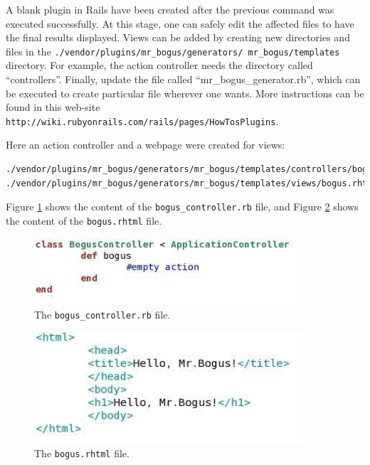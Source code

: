\documentclass{article}
\begin{document}
A blank plugin in Rails have been created after the previous command was executed successfully. At this stage, one can safely edit the affected files to have the final results displayed. Views can be added by creating new directories and files in the \texttt{./vendor/plugins/mr\_bogus/generators/ mr\_bogus/templates} directory. For example, the action controller needs the directory called ``controllers''. Finally, update the file called ``mr\_bogus\_generator.rb'', which can be executed to create particular file wherever one wants. More instructions can be found in this web-site \texttt{http://wiki.rubyonrails.com/rails/pages/HowTosPlugins}.

Here an action controller and a webpage were created for views:

\begin{verbatim}
./vendor/plugins/mr_bogus/generators/mr_bogus/templates/controllers/bogus_controller.rb
./vendor/plugins/mr_bogus/generators/mr_bogus/templates/views/bogus.rhtml
\end{verbatim}

Figure \ref{fig:instruction-3} shows the content of the \texttt{bogus\_controller.rb} file, and Figure \ref{fig:instruction-4} shows the content of the \texttt{bogus.rhtml} file.

\begin{figure}
\begin{centering}    
\includegraphics[width=100mm]{fig/instruction-3}
\end{centering}
\caption{The \texttt{bogus\_controller.rb} file.}
\label{fig:instruction-3}
\end{figure}

\begin{figure}
\begin{centering}
\includegraphics[width=100mm]{fig/instruction-4}
\end{centering}    
\caption{The \texttt{bogus.rhtml} file.}
\label{fig:instruction-4}
\end{figure}
\end{document}

